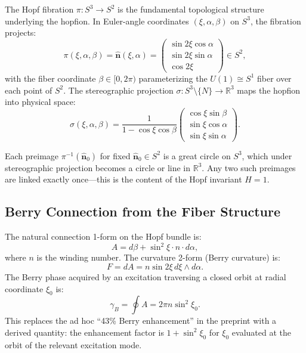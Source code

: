 \documentclass[11pt,letterpaper]{article}
\begin{document}
The Hopf fibration $\pi: S^3 \to S^2$ is the fundamental topological structure underlying the hopfion. In Euler-angle coordinates $(\xi, \alpha, \beta)$ on $S^3$, the fibration projects:
\begin{equation}
\pi(\xi, \alpha, \beta) = \hat{\mathbf{n}}(\xi, \alpha) = \begin{pmatrix} \sin 2\xi \cos\alpha \\ \sin 2\xi \sin\alpha \\ \cos 2\xi \end{pmatrix} \in S^2,
\end{equation}
with the fiber coordinate $\beta \in [0, 2\pi)$ parameterizing the $U(1) \cong S^1$ fiber over each point of $S^2$. The stereographic projection $\sigma: S^3 \setminus \{N\} \to \mathbb{R}^3$ maps the hopfion into physical space:
\begin{equation}
\sigma(\xi, \alpha, \beta) = \frac{1}{1 - \cos\xi\cos\beta}\begin{pmatrix} \cos\xi\sin\beta \\ \sin\xi\cos\alpha \\ \sin\xi\sin\alpha \end{pmatrix}.
\end{equation}

Each preimage $\pi^{-1}(\hat{\mathbf{n}}_0)$ for fixed $\hat{\mathbf{n}}_0 \in S^2$ is a great circle on $S^3$, which under stereographic projection becomes a circle or line in $\mathbb{R}^3$. Any two such preimages are linked exactly once---this is the content of the Hopf invariant $H = 1$.

\subsection{Berry Connection from the Fiber Structure}

The natural connection 1-form on the Hopf bundle is:
\begin{equation}
A = d\beta + \sin^2\xi \cdot n \cdot d\alpha,
\label{eq:berry_connection}
\end{equation}
where $n$ is the winding number. The curvature 2-form (Berry curvature) is:
\begin{equation}
F = dA = n\sin 2\xi\, d\xi \wedge d\alpha.
\end{equation}
The Berry phase acquired by an excitation traversing a closed orbit at radial coordinate $\xi_0$ is:
\begin{equation}
\gamma_B = \oint A = 2\pi n \sin^2\xi_0.
\label{eq:berry_phase}
\end{equation}
This replaces the ad hoc ``43\% Berry enhancement'' in the preprint with a derived quantity: the enhancement factor is $1 + \sin^2\xi_0$ for $\xi_0$ evaluated at the orbit of the relevant excitation mode.
\end{document}
